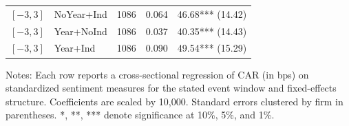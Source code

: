 \begin{table}[p]
\begin{tabular}{l l r r l}
$[-3,3]$ & NoYear+Ind & 1086 & 0.064 & 46.68*** (14.42) \\
$[-3,3]$ & Year+NoInd & 1086 & 0.037 & 40.35*** (14.43) \\
$[-3,3]$ & Year+Ind & 1086 & 0.090 & 49.54*** (15.29) \\
\bottomrule
\end{tabular}
\parbox{0.95\linewidth}{\footnotesize Notes: Each row reports a cross-sectional regression of CAR (in bps) on standardized sentiment measures for the stated event window and fixed-effects structure. Coefficients are scaled by 10,000. Standard errors clustered by firm in parentheses. *, **, *** denote significance at 10\%, 5\%, and 1\%.}
\end{table}
